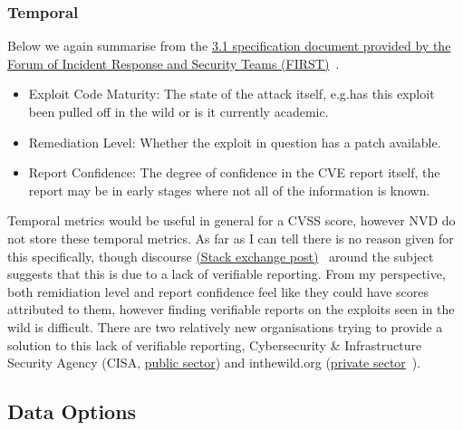 \documentclass[12pt]{article}
\begin{document}
\subsubsection{Temporal}

Below we again summarise from the
\href{https://www.first.org/cvss/v3.1/specification-document}{3.1 specification document
	provided by the Forum of Incident Response and Security Teams (FIRST)}~\cite{CVSS_31}.

\begin{itemize}

	\item Exploit Code Maturity: The state of the attack itself, e.g.\@ has this exploit been pulled
	      off in the wild or is it currently academic.

	\item Remediation Level: Whether the exploit in question has a patch available.

	\item Report Confidence: The degree of confidence in the CVE report itself, the report may be in
	      early stages where not all of the information is known.

\end{itemize}


\bigskip

Temporal metrics would be useful in general for a CVSS score, however NVD do not store these
temporal metrics. As far as I can tell there is no reason given for this specifically, though
discourse
\href{https://security.stackexchange.com/questions/270257/cvss-v3-and-v3-1-missing-temporal-metrics-exploit-code-maturity-and-remediation}{(Stack exchange post)}~\cite{stack_exchange} around the subject suggests that this is due to a lack
of verifiable reporting. From my perspective, both remidiation level and report confidence feel like
they could have scores attributed to them, however finding verifiable reports on the exploits seen
in the wild is difficult. There are two relatively new organisations trying to provide a solution to
this lack of verifiable reporting,
Cybersecurity \& Infrastructure Security Agency (CISA,
\href{https://www.cisa.gov/known-exploited-vulnerabilities-catalog}{public sector}) and
inthewild.org (\href{https://inthewild.io/}{private sector}~\cite{cisa}).

\subsection{Data Options}
\end{document}
